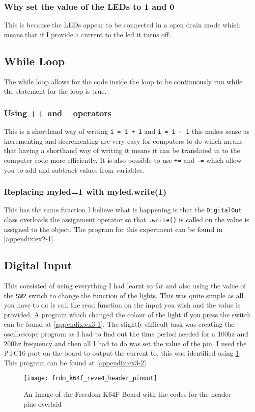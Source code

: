 \documentclass[a4paper,12pt]{scrartcl}
\begin{document}
{{			\subsubsection{Why set the value of the LEDs to 1 and 0}
			{
				This is because the LEDs appear to be connected in a open drain mode which means that if I provide a current to the led it turns off.
			}
		}
		\subsection{While Loop}
		{
			The while loop allows for the code inside the loop to be continuously run while the statement for the loop is true.
			\subsubsection{Using ++ and -- operators}
			{
				This is a shorthand way of writing \lstinline|i = i + 1| and \lstinline|i = i - 1| this makes sense as incrementing and decrementing are very easy for computers to do which means that having a shorthand way of writing it means it can be translated in to the computer code more efficiently. It is also possible to use \lstinline|+=| and \lstinline|-=| which allow you to add and subtract values from variables.
			}
			\subsubsection{Replacing myled=1 with myled.write(1)}
			{
				This has the same function I believe what is happening is that the \lstinline|DigitalOut| class overloads the assignment operator so that \lstinline|.write()| is called on the value is assigned to the object. The program for this experiment can be found in \cref{appendix:ex2-1}.
			}
		}
		\subsection{Digital Input}
		{
			This consisted of using everything I had learnt so far and also using the value of the \lstinline|SW2| switch to change the function of the lights. This was quite simple as all you have to do is call the read function on the input you wish and the value is provided. A program which changed the colour of the light if you press the switch can be found at \cref{appendix:ex3-1}. The slightly difficult task was creating the oscilloscope program as I had to find out the time period needed for a 100hz and 200hz frequency and then all I had to do was set the value of the pin. I used the PTC16 port on the board to output the current to, this was identified using \cref{img:FRDM-K64F-HEADERPINS}. This program can be found at \cref{appendix:ex3-2}
			\begin{figure}
				\centering
				\texttt{[image: frdm\_k64f\_reve4\_header\_pinout]}
				\caption{An Image of the Freedom-K64F Board with the codes for the header pins overlaid\cite{armlimited2015}}
				\label{img:FRDM-K64F-HEADERPINS}
			\end{figure}
		}
	}
\end{document}
